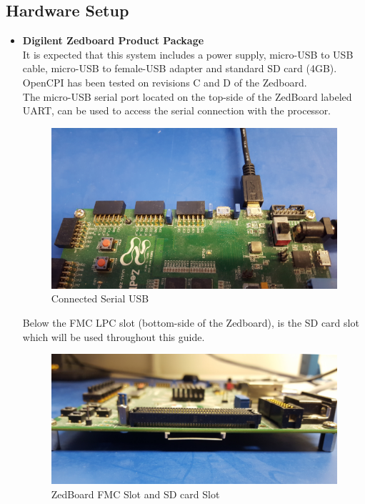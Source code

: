 \begin{flushleft}
\subsection{Hardware Setup}
\begin{itemize}
\item \textbf{Digilent Zedboard Product Package}\\ \medskip
It is expected that this system includes a power supply, micro-USB to USB cable, micro-USB to female-USB adapter and standard SD card (4GB). \\ \medskip
OpenCPI has been tested on revisions C and D of the Zedboard.\\ \medskip
The micro-USB serial port located on the top-side of the ZedBoard labeled UART, can be used to access the serial connection with the processor.\medskip

\begin{figure}[H]
	\centerline{\includegraphics[scale=0.05]{zed_uart}}
	\caption{Connected Serial USB}
	\label{fig:zed_uart}
\end{figure}

Below the FMC LPC slot (bottom-side of the Zedboard), is the SD card slot which will be used throughout this guide.
\begin{figure}[H]
	\centerline{\includegraphics[scale=0.05]{zed_fmc_sd}}
	\caption{ZedBoard FMC Slot and SD card Slot}
	\label{fig:zed_fmc_sd}
\end{figure}


\end{itemize}
\end{flushleft}
